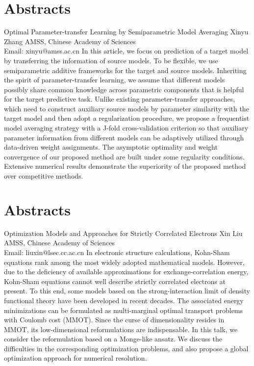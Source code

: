 \documentclass[
	openany, %
	parskip=full, %
	12pt, %
	a4paper, %
]{conferencebooklet} %
\begin{document}
\chapter*{Abstracts}
\abstract
    {Optimal Parameter-transfer Learning by Semiparametric Model Averaging}
    {Xinyu Zhang}
    {}
    {AMSS, Chinese Academy of Sciences\\
    Email: xinyu@amss.ac.cn}
    {In this article, we focus on prediction of a target model by transferring the information of source models. To be flexible, we use semiparametric additive frameworks for the target and source models. Inheriting the spirit of parameter-transfer learning, we assume that different models possibly share common knowledge across parametric components that is helpful for the target predictive task. Unlike existing parameter-transfer approaches, which need to construct auxiliary source models by parameter similarity with the target model and then adopt a regularization procedure, we propose a frequentist model averaging strategy with a J-fold cross-validation criterion so that auxiliary parameter information from different models can be adaptively utilized through data-driven weight assignments. The asymptotic optimality and weight convergence of our proposed method are built under some regularity conditions. Extensive numerical results demonstrate the superiority of the proposed method over competitive methods.}



\chapter*{Abstracts}
\abstract
    {Optimization Models and Approaches for Strictly Correlated Electrons}
    {Xin Liu}
    {}
    {AMSS, Chinese Academy of Sciences\\
    Email: liuxin@lsec.cc.ac.cn}
    {In electronic structure calculations, Kohn-Sham equations rank among the most widely adopted mathematical models. However, due to the deficiency of available approximations for exchange-correlation energy, Kohn-Sham equations cannot well describe strictly correlated electrons at present. To this end, some models based on the strong-interaction limit of density functional theory have been developed in recent decades. The associated energy minimizations can be formulated as multi-marginal optimal transport problems with Coulomb cost (MMOT). Since the curse of dimensionality resides in MMOT, its low-dimensional reformulations are indispensable. In this talk, we consider the reformulation based on a Monge-like ansatz. We discuss the difficulties in the corresponding optimization problems, and also propose a global optimization approach for numerical resolution.}
\end{document}
